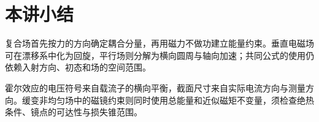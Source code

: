 \section{本讲小结}
复合场首先按力的方向确定耦合分量，再用磁力不做功建立能量约束。垂直电磁场可在漂移系中化为回旋，平行场则分解为横向圆周与轴向加速；共同公式的使用仍依赖入射方向、初态和场的空间范围。

霍尔效应的电压符号来自载流子的横向平衡，截面尺寸来自实际电流方向与测量方向。缓变非均匀场中的磁镜约束则同时使用总能量和近似磁矩不变量，须检查绝热条件、镜点的可达性与损失锥范围。
